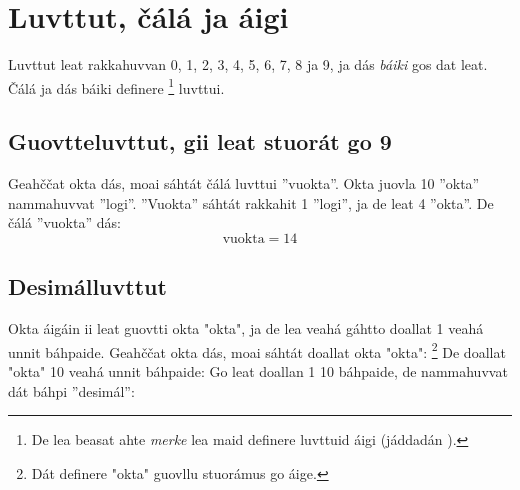 	\newpage
	
	
	\newpage
	\section{Luvttut, čálá ja áigi \label{tallsiff}}
	Luvttut leat rakkahuvvan
	0, 1, 2, 3, 4, 5, 6, 7, 8 ja 9, ja dás \textsl{báiki} gos dat leat. Čálá ja dás báiki definere
	\footnote{De lea beasat ahte \textit{merke} lea maid definere luvttuid áigi (jáddadán ).}
	 luvttui.
	
	\subsection*{Guovtteluvttut, gii leat stuorát go 9}
	Geahččat okta dás, moai sáhtát čálá luvttui ''vuokta''. 
	Okta juovla 10 ''okta'' nammahuvvat ''logi''. ''Vuokta'' sáhtát rakkahit 1 ''logi'', ja de leat 4 ''okta''. De čálá ''vuokta'' dás:
	\[ \text{vuokta}=14 \]
	\vsk
	
	\newpage
	\subsection*{Desimálluvttut}
	Okta áigáin ii leat guovtti okta "okta", ja de lea veahá gáhtto doallat 1 veahá unnit báhpaide. Geahččat okta dás, moai sáhtát doallat okta "okta":
	\footnote{Dát definere "okta" guovllu stuorámus go áige.}
	De doallat "okta" 10 veahá unnit báhpaide:
	 \vs
	Go leat doallan 1 10 báhpaide, de nammahuvvat dát báhpi ''desimál'':
	
